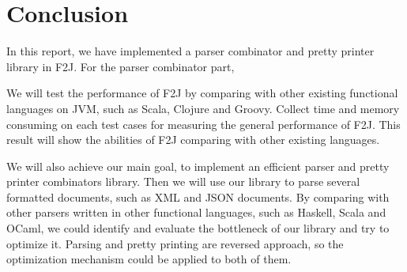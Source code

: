 \chapter{Conclusion}
In this report, we have implemented a parser combinator and pretty printer library in F2J. For the parser combinator part, 

We will test the performance of F2J by comparing with other existing functional languages on JVM, such as Scala, Clojure and Groovy. Collect time and memory consuming on each test cases for measuring the general performance of F2J. This result will show the abilities of F2J comparing with other existing languages.

We will also achieve our main goal, to implement an efficient parser and pretty printer combinators library. Then we will use our library to parse several formatted documents, such as XML and JSON documents. By comparing with other parsers written in other functional languages, such as Haskell, Scala and OCaml, we could identify and evaluate the bottleneck of our library and try to optimize it. Parsing and pretty printing are reversed approach, so the optimization mechanism could be applied to both of them.
